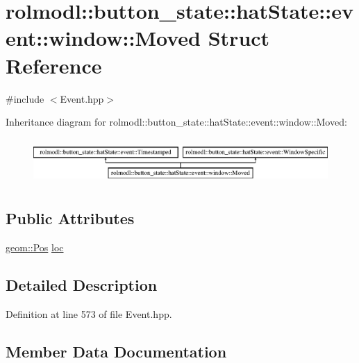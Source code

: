 \hypertarget{structrolmodl_1_1button__state_1_1hat_state_1_1event_1_1window_1_1_moved}{}\section{rolmodl\+::button\+\_\+state\+::hat\+State\+::event\+::window\+::Moved Struct Reference}
\label{structrolmodl_1_1button__state_1_1hat_state_1_1event_1_1window_1_1_moved}


{\ttfamily \#include $<$Event.\+hpp$>$}

Inheritance diagram for rolmodl\+::button\+\_\+state\+::hat\+State\+::event\+::window\+::Moved\+:\begin{figure}[H]
\begin{center}
\leavevmode
\includegraphics[height=1.761006cm]{structrolmodl_1_1button__state_1_1hat_state_1_1event_1_1window_1_1_moved}
\end{center}
\end{figure}
\subsection*{Public Attributes}
\begin{DoxyCompactItemize}
\item 
\mbox{\hyperlink{structrolmodl_1_1geom_1_1_pos}{geom\+::\+Pos}} \mbox{\hyperlink{structrolmodl_1_1button__state_1_1hat_state_1_1event_1_1window_1_1_moved_a1f84c010c96708837a5563ba148bfeb8}{loc}}
\end{DoxyCompactItemize}


\subsection{Detailed Description}


Definition at line 573 of file Event.\+hpp.



\subsection{Member Data Documentation}
\mbox{\label{structrolmodl_1_1button__state_1_1hat_state_1_1event_1_1window_1_1_moved_a1f84c010c96708837a5563ba148bfeb8}} 
